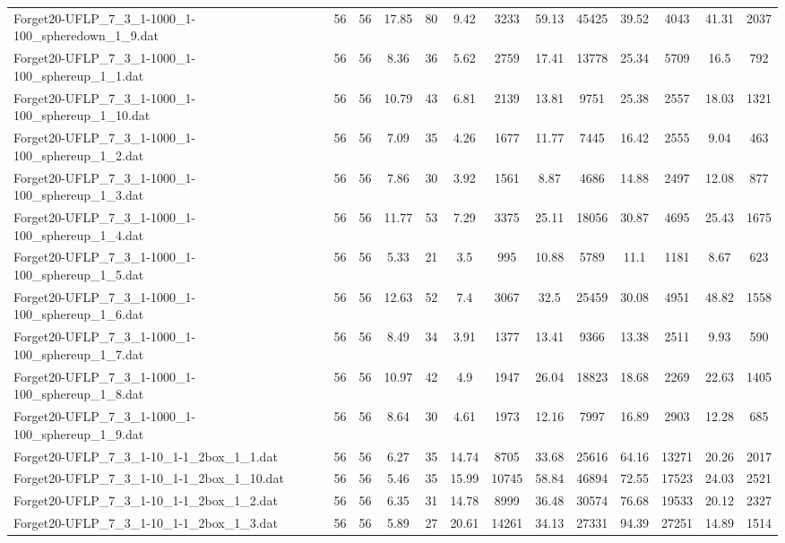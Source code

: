 \begin{table}[!ht]
{\begin{tabular}{lcccccccccccc}
Forget20-UFLP\_7\_3\_1-1000\_1-100\_spheredown\_1\_9.dat & 56 & 56 & 17.85 & 80 & 9.42 & 3233 & 59.13 & 45425 & 39.52 & 4043 & 41.31 & 2037 \\
Forget20-UFLP\_7\_3\_1-1000\_1-100\_sphereup\_1\_1.dat & 56 & 56 & 8.36 & 36 & 5.62 & 2759 & 17.41 & 13778 & 25.34 & 5709 & 16.5 & 792 \\
Forget20-UFLP\_7\_3\_1-1000\_1-100\_sphereup\_1\_10.dat & 56 & 56 & 10.79 & 43 & 6.81 & 2139 & 13.81 & 9751 & 25.38 & 2557 & 18.03 & 1321 \\
Forget20-UFLP\_7\_3\_1-1000\_1-100\_sphereup\_1\_2.dat & 56 & 56 & 7.09 & 35 & 4.26 & 1677 & 11.77 & 7445 & 16.42 & 2555 & 9.04 & 463 \\
Forget20-UFLP\_7\_3\_1-1000\_1-100\_sphereup\_1\_3.dat & 56 & 56 & 7.86 & 30 & 3.92 & 1561 & 8.87 & 4686 & 14.88 & 2497 & 12.08 & 877 \\
Forget20-UFLP\_7\_3\_1-1000\_1-100\_sphereup\_1\_4.dat & 56 & 56 & 11.77 & 53 & 7.29 & 3375 & 25.11 & 18056 & 30.87 & 4695 & 25.43 & 1675 \\
Forget20-UFLP\_7\_3\_1-1000\_1-100\_sphereup\_1\_5.dat & 56 & 56 & 5.33 & 21 & 3.5 & 995 & 10.88 & 5789 & 11.1 & 1181 & 8.67 & 623 \\
Forget20-UFLP\_7\_3\_1-1000\_1-100\_sphereup\_1\_6.dat & 56 & 56 & 12.63 & 52 & 7.4 & 3067 & 32.5 & 25459 & 30.08 & 4951 & 48.82 & 1558 \\
Forget20-UFLP\_7\_3\_1-1000\_1-100\_sphereup\_1\_7.dat & 56 & 56 & 8.49 & 34 & 3.91 & 1377 & 13.41 & 9366 & 13.38 & 2511 & 9.93 & 590 \\
Forget20-UFLP\_7\_3\_1-1000\_1-100\_sphereup\_1\_8.dat & 56 & 56 & 10.97 & 42 & 4.9 & 1947 & 26.04 & 18823 & 18.68 & 2269 & 22.63 & 1405 \\
Forget20-UFLP\_7\_3\_1-1000\_1-100\_sphereup\_1\_9.dat & 56 & 56 & 8.64 & 30 & 4.61 & 1973 & 12.16 & 7997 & 16.89 & 2903 & 12.28 & 685 \\
Forget20-UFLP\_7\_3\_1-10\_1-1\_2box\_1\_1.dat & 56 & 56 & 6.27 & 35 & 14.74 & 8705 & 33.68 & 25616 & 64.16 & 13271 & 20.26 & 2017 \\
Forget20-UFLP\_7\_3\_1-10\_1-1\_2box\_1\_10.dat & 56 & 56 & 5.46 & 35 & 15.99 & 10745 & 58.84 & 46894 & 72.55 & 17523 & 24.03 & 2521 \\
Forget20-UFLP\_7\_3\_1-10\_1-1\_2box\_1\_2.dat & 56 & 56 & 6.35 & 31 & 14.78 & 8999 & 36.48 & 30574 & 76.68 & 19533 & 20.12 & 2327 \\
Forget20-UFLP\_7\_3\_1-10\_1-1\_2box\_1\_3.dat & 56 & 56 & 5.89 & 27 & 20.61 & 14261 & 34.13 & 27331 & 94.39 & 27251 & 14.89 & 1514 \\

\end{tabular}}
\end{table}
